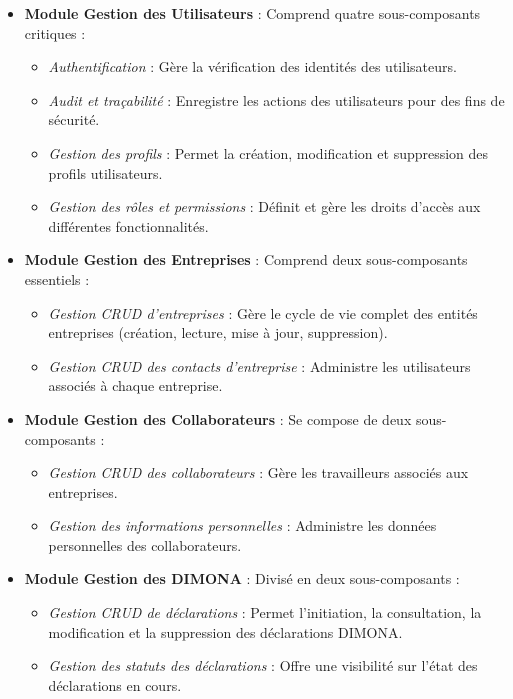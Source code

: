 \begin{itemize}[leftmargin=*,label=\textcolor{darkgray}{$\bullet$},itemsep=0.3em]
  \item \textbf{Module Gestion des Utilisateurs} : Comprend quatre sous-composants critiques :
    \begin{itemize}[leftmargin=*,label=\textcolor{darkgray}{$\bullet$},itemsep=0.3em]
      \item \textit{Authentification} : Gère la vérification des identités des utilisateurs.
      \item \textit{Audit et traçabilité} : Enregistre les actions des utilisateurs pour des fins de sécurité.
      \item \textit{Gestion des profils} : Permet la création, modification et suppression des profils utilisateurs.
      \item \textit{Gestion des rôles et permissions} : Définit et gère les droits d'accès aux différentes fonctionnalités.
    \end{itemize}
  
  \item \textbf{Module Gestion des Entreprises} : Comprend deux sous-composants essentiels :
    \begin{itemize}[leftmargin=*,label=\textcolor{darkgray}{$\bullet$},itemsep=0.3em]
      \item \textit{Gestion CRUD d'entreprises} : Gère le cycle de vie complet des entités entreprises (création, lecture, mise à jour, suppression).
      \item \textit{Gestion CRUD des contacts d'entreprise} : Administre les utilisateurs associés à chaque entreprise.
    \end{itemize}
  
  \item \textbf{Module Gestion des Collaborateurs} : Se compose de deux sous-composants :
    \begin{itemize}[leftmargin=*,label=\textcolor{darkgray}{$\bullet$},itemsep=0.3em]
      \item \textit{Gestion CRUD des collaborateurs} : Gère les travailleurs associés aux entreprises.
      \item \textit{Gestion des informations personnelles} : Administre les données personnelles des collaborateurs.
    \end{itemize}
  
  \item \textbf{Module Gestion des DIMONA} : Divisé en deux sous-composants :
    \begin{itemize}[leftmargin=*,label=\textcolor{darkgray}{$\bullet$},itemsep=0.3em]
      \item \textit{Gestion CRUD de déclarations} : Permet l'initiation, la consultation, la modification et la suppression des déclarations DIMONA.
      \item \textit{Gestion des statuts des déclarations} : Offre une visibilité sur l'état des déclarations en cours.
    \end{itemize}
    

\end{itemize}
